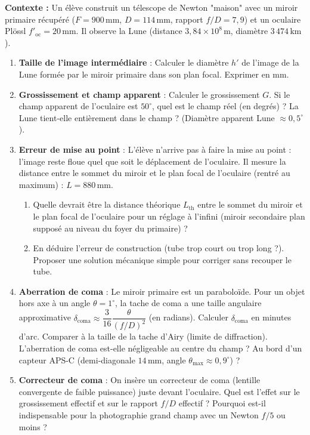 \documentclass[11pt]{article}
\begin{document}
\begin{exercice}
\textbf{Contexte :} Un élève construit un télescope de Newton "maison" avec un miroir primaire récupéré ($F = 900\,\text{mm}$, $D = 114\,\text{mm}$, rapport $f/D = 7,9$) et un oculaire Plössl $f'_{\text{oc}} = 20\,\text{mm}$. Il observe la Lune (distance $3,84 \times 10^8\,\text{m}$, diamètre $3\,474\,\text{km}$).
\begin{enumerate}
    \item \textbf{Taille de l'image intermédiaire} : Calculer le diamètre $h'$ de l'image de la Lune formée par le miroir primaire dans son plan focal. Exprimer en mm.
    \item \textbf{Grossissement et champ apparent} : Calculer le grossissement $G$. Si le champ apparent de l'oculaire est $50^\circ$, quel est le champ réel (en degrés) ? La Lune tient-elle entièrement dans le champ ? (Diamètre apparent Lune $\approx 0,5^\circ$).
    \item \textbf{Erreur de mise au point} : L'élève n'arrive pas à faire la mise au point : l'image reste floue quel que soit le déplacement de l'oculaire. Il mesure la distance entre le sommet du miroir et le plan focal de l'oculaire (rentré au maximum) : $L = 880\,\text{mm}$.
        \begin{enumerate}
            \item Quelle devrait être la distance théorique $L_{\text{th}}$ entre le sommet du miroir et le plan focal de l'oculaire pour un réglage à l'infini (miroir secondaire plan supposé au niveau du foyer du primaire) ?
            \item En déduire l'erreur de construction (tube trop court ou trop long ?). Proposer une solution mécanique simple pour corriger sans recouper le tube.
        \end{enumerate}
    \item \textbf{Aberration de coma} : Le miroir primaire est un paraboloïde. Pour un objet hors axe à un angle $\theta = 1^\circ$, la tache de coma a une taille angulaire approximative $\delta_{\text{coma}} \approx \dfrac{3}{16} \dfrac{\theta}{(f/D)^2}$ (en radians). Calculer $\delta_{\text{coma}}$ en minutes d'arc. Comparer à la taille de la tache d'Airy (limite de diffraction). L'aberration de coma est-elle négligeable au centre du champ ? Au bord d'un capteur APS-C (demi-diagonale $14\,\text{mm}$, angle $\theta_{\max} \approx 0,9^\circ$) ?
    \item \textbf{Correcteur de coma} : On insère un correcteur de coma (lentille convergente de faible puissance) juste devant l'oculaire. Quel est l'effet sur le grossissement effectif et sur le rapport $f/D$ effectif ? Pourquoi est-il indispensable pour la photographie grand champ avec un Newton $f/5$ ou moins ?
\end{enumerate}
\end{exercice}
\end{document}
